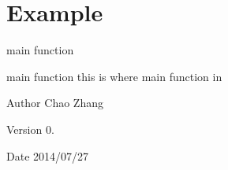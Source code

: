 \hypertarget{group__example}{\section{\-Example}
\label{group__example}
}


main function  


main function this is where main function in

\begin{DoxyAuthor}{\-Author}
\-Chao \-Zhang 
\end{DoxyAuthor}
\begin{DoxyVersion}{\-Version}
0. 
\end{DoxyVersion}
\begin{DoxyDate}{\-Date}
2014/07/27 
\end{DoxyDate}
